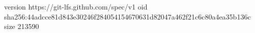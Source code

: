 version https://git-lfs.github.com/spec/v1
oid sha256:44adcce81d843e30246f284054154670631d82047a462f21c6c80a4ea35b136c
size 213590

